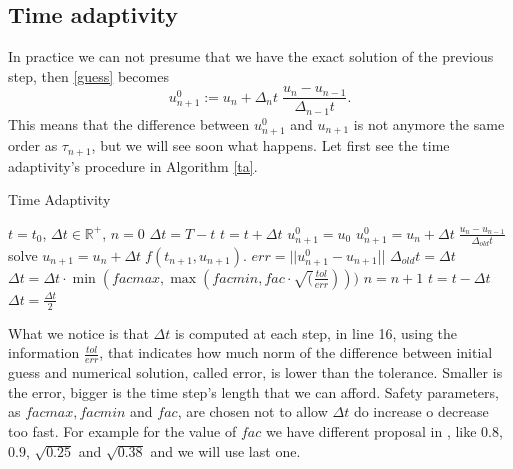 \subsection{Time adaptivity}
In practice we can not presume that we have the exact solution of the previous step, then \eqref{guess} becomes 
\begin{equation*}
u_{n+1}^0 := u_n + \Delta_n t \; \frac{u_{n} - u_{n-1}}{\Delta_{n-1}t}.
\end{equation*}
This means that the difference between $ u^0_{n+1} $ and $ u_{n+1} $ is not anymore the same order as $ \tau_{n+1} $, but we will see soon what happens. Let first see the time adaptivity's procedure in Algorithm \ref{ta}.\\
\begin{algorithm}
	\caption{Time Adaptivity}
	\label{ta}
	\begin{algorithmic}[1]
		\STATE 	$ t = t_0 $,  $ \Delta t \in \mathbb{R}^+ $, $ n = 0 $
		\STATE $ \Delta t = T - t$
		\ENDIF
		\STATE $ t = t + \Delta t $
		\STATE $ u^0_{n+1} = u_0 $
		\ELSE
		\STATE $ u_{n+1}^0 = u_n + \Delta t \; \frac{u_{n} - u_{n-1}}{\Delta_{old}t} $
		\ENDIF 
		\STATE solve $ u_{n+1} = u_n + \Delta t \; f(t_{n+1} , u_{n+1}).
		$
		\STATE $ err = ||u_{n+1}^0 - u_{n+1}$||
		\STATE $ \Delta_{old} t =  \Delta t$
		\STATE $\Delta t =\Delta t \cdot \min (facmax, \max (facmin, fac \cdot \sqrt(\frac{tol}{err})))$ 
		\STATE $n = n+1$
		\ELSE
		\STATE $ t = t - \Delta t $
		\STATE $ \Delta t = \frac{\Delta t}{2} $
		\ENDIF
		\ENDWHILE
	\end{algorithmic}
\end{algorithm}
What we notice is that $ \Delta t $ is computed at each step, in line 16, using the information $ \frac{tol}{err} $, that indicates how much norm of the difference between initial guess and numerical solution, called error, is lower than the tolerance. Smaller is the error, bigger is the time step's length that we can afford. Safety parameters, as $ facmax, facmin $ and $ fac $, are chosen not to allow $ \Delta t $ do increase o decrease too fast. 
For example for the value of $ fac $ we have different proposal in \cite{solvingordeq}, like $ 0.8 $, $ 0.9 $, $\sqrt{0.25}  $ and $ \sqrt{0.38} $ and we will use last one. \\
